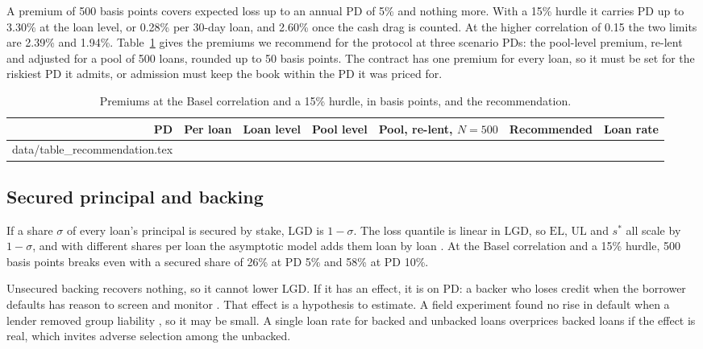 \documentclass[11pt]{article}
\makeatletter
\theoremstyle{plain}
\theoremstyle{definition}
\newcommand{\inputrows}[1]{\@@input #1 }
\newcommand{\EL}{\mathrm{EL}}
\newcommand{\UL}{\mathrm{UL}}
\makeatother
\begin{document}
A premium of 500 basis points covers expected loss up to an annual PD of 5\% and nothing more. With
a 15\% hurdle it carries PD up to 3.30\% at the loan level, or 0.28\% per 30-day loan, and 2.60\% once
the cash drag is counted. At the higher correlation of 0.15 the two limits are 2.39\% and 1.94\%.
Table~\ref{tab:recommendation} gives the premiums we recommend for the protocol at three scenario
PDs: the pool-level premium, re-lent and adjusted for a pool of 500 loans, rounded up to 50 basis
points. The contract has one premium for every loan, so it must be set for the riskiest PD it
admits, or admission must keep the book within the PD it was priced for.

\begin{table}[ht]
  \centering\small
  \caption{Premiums at the Basel correlation and a 15\% hurdle, in basis points, and the
  recommendation.}
  \label{tab:recommendation}
  \begin{tabular}{rrrrrrr}
    \toprule
    PD & Per loan & Loan level & Pool level & Pool, re-lent, $N=500$ & Recommended & Loan rate \\
    \midrule
    \inputrows{data/table_recommendation.tex}
    \bottomrule
  \end{tabular}
\end{table}

\subsection{Secured principal and backing}

If a share $\sigma$ of every loan's principal is secured by stake, LGD is $1-\sigma$. The loss
quantile is linear in LGD, so $\EL$, $\UL$ and $s^*$ all scale by $1-\sigma$, and with different
shares per loan the asymptotic model adds them loan by loan \citep{gordy2003}. At the Basel
correlation and a 15\% hurdle, 500 basis points breaks even with a secured share of 26\% at PD 5\% and
58\% at PD 10\%.

Unsecured backing recovers nothing, so it cannot lower LGD. If it has an effect, it is on PD: a
backer who loses credit when the borrower defaults has reason to screen and monitor
\citep{stiglitz1990peer,ghatak1999joint}. That effect is a hypothesis to estimate. A field experiment
found no rise in default when a lender removed group liability \citep{gine2014group}, so it may be
small. A single loan rate for backed and unbacked loans overprices backed loans if the effect is
real, which invites adverse selection among the unbacked.
\end{document}
